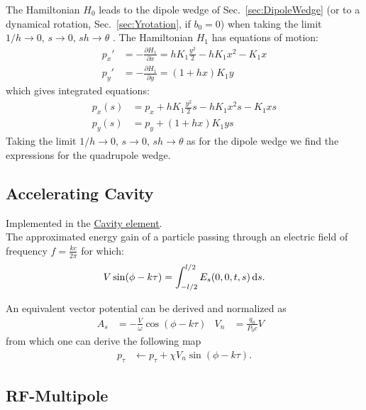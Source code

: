 The Hamiltonian $H_0$ leads to the dipole wedge of Sec.~\ref{sec:DipoleWedge} (or to a dynamical rotation, Sec.~\ref{sec:Yrotation}, if $b_0 = 0$) when taking the limit $1/h \to 0, \, s \to 0, \, s h \to \theta$ .
The Hamiltonian $H_1$ has equations of motion:
\begin{align}
p_x' &= -\frac{\partial H_1}{\partial x}
= h K_1 \frac{y^2}{2} - h K_1 x^2 - K_1 x
\label{eq:pxprime}
\\
p_y' &= -\frac{\partial H_1}{\partial y}
= (1 + h x) K_1 y
\label{eq:pyprime}
\end{align}
which gives integrated equations:
\begin{align}
p_x(s) &= p_x + h K_1 \frac{y^2}{2} s - h K_1 x^2 s - K_1 x s
\label{eq:pxs}
\\
p_y(s) &= p_y + (1 + h x) K_1 y s
\label{eq:pys}
\end{align}
Taking the limit $1/h \to 0, \, s \to 0, \, s h \to \theta$ as for the dipole wedge we find the expressions for the quadrupole wedge.





\subsection{Accelerating Cavity}

Implemented in the \href{https://xsuite.readthedocs.io/en/latest/apireference.html#cavity}{\underline{Cavity element}}.
~\\

The approximated energy gain of a particle passing through an electric field of frequency $f=\frac{kc}{2\pi}$ for which:
\begin{align}
V \sin(\phi - k \tau) = \int_{-l/2}^{l/2} E_s(0,0,t,s)  {\rm \,d}s.
\end{align}

An equivalent vector potential can be derived and normalized as
\begin{align}
A_s& = - \frac{V}{\omega} \cos(\phi - k \tau ) &
V_n&=  \frac{q_0}{P_0 c} V  &
\end{align}
from which one can derive the following map
\begin{align}
p_\tau & \leftarrow p_\tau + \chi V_n \sin(\phi - k \tau).
\end{align}



\subsection{RF-Multipole}

